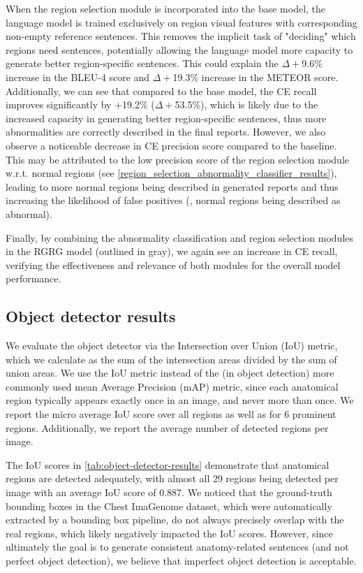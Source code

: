 \documentclass[10pt,twocolumn,letterpaper]{article}
\begin{document}
When the region selection module is incorporated into the base model, the language model is trained exclusively on region visual features with corresponding non-empty reference sentences. This removes the implicit task of "deciding" which regions need sentences, potentially allowing the language model more capacity to generate better region-specific sentences. This could explain the $\Delta+$9.6\% increase in the BLEU-4 score and $\Delta+$19.3\% increase in the METEOR score. Additionally, we can see that compared to the base model, the CE recall improves significantly by $+$19.2\% ($\Delta+$53.5\%), which is likely due to the increased capacity in generating better region-specific sentences, thus more abnormalities are correctly described in the final reports. However, we also observe a noticeable decrease in CE precision score compared to the baseline. This may be attributed to the low precision score of the region selection module w.r.t. normal regions (see \cref{region_selection_abnormality_classifier_results}), leading to more normal regions being described in generated reports and thus increasing the likelihood of false positives (\ie, normal regions being described as abnormal).

Finally, by combining the abnormality classification and region selection modules in the RGRG model (outlined in gray), we again see an increase in CE recall, verifying the effectiveness and relevance of both modules for the overall model performance.


\subsection{Object detector results}\label{appendix:od_results}

We evaluate the object detector via the Intersection over Union (IoU) metric, which we calculate as the sum of the intersection areas divided by the sum of union areas. We use the IoU metric instead of the (in object detection) more commonly used mean Average Precision (mAP) metric, since each anatomical region typically appears exactly once in an image, and never more than once. We report the micro average IoU score over all regions as well as for 6 prominent regions. Additionally, we report the average number of detected regions per image.

The IoU scores in \cref{tab:object-detector-results} demonstrate that anatomical regions are detected adequately, with almost all 29 regions being detected per image with an average IoU score of 0.887. We noticed that the ground-truth bounding boxes in the Chest ImaGenome dataset, which were automatically extracted by a bounding box pipeline, do not always precisely overlap with the real regions, which likely negatively impacted the IoU scores. However, since ultimately the goal is to generate consistent anatomy-related sentences (and not perfect object detection), we believe that imperfect object detection is acceptable.
\end{document}
